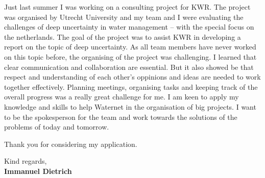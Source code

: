 \documentclass[11pt]{report}
\begin{document}
\begin{titlepage}
\vspace{0.7em}

Just last summer I was working on a consulting project for KWR. The project was organised by Utrecht University and my team and I were evaluating the challenges of deep uncertainty in water management -- with the special focus on the netherlands. 
The goal of the project was to assist KWR in developing a report on the topic of deep uncertainty. As all team members have never worked on this topic before, the organising of the project was challenging. I learned that clear communication and 
collaboration are essential. But it also showed be that respect and understanding of each other's oppinions and ideas are needed to work together effectively. Planning meetings, organising tasks and keeping track of the overall progress 
was a really great challenge for me. I am keen to apply my knowledge and skills to help Waternet in the organisation of big projects. I want to be the spokesperson for the team and work towards the solutions of the problems of today and tomorrow.

\vspace{0.7em}

Thank you for considering my application.

\vspace{0.7em}

\raggedright Kind regards,\\
\textbf{Immanuel Dietrich}

\end{titlepage}
\end{document}
